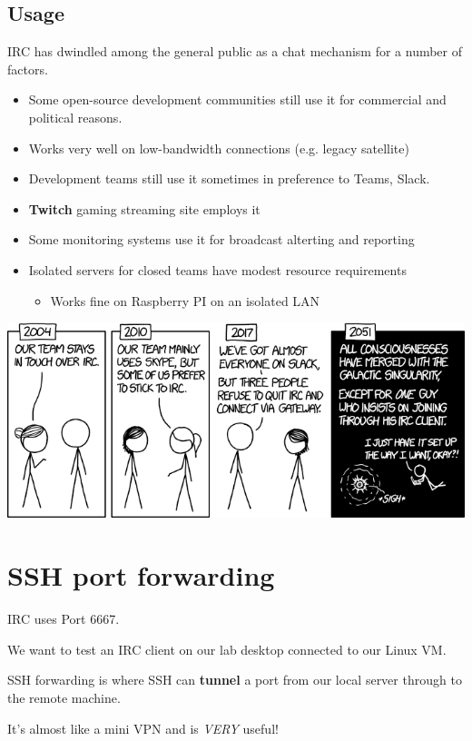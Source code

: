 \documentclass[slides]{pgnotes}
\begin{document}
\subsection{Usage}

IRC has dwindled among the general public as a chat mechanism for a number of factors.

\begin{itemize}
\item Some open-source development communities still use it for commercial and political reasons.
\item Works very well on low-bandwidth connections (e.g. legacy satellite)
\item Development teams still use it sometimes in preference to Teams, Slack.
\item \textbf{Twitch} gaming streaming site employs it
\item Some monitoring systems use it for broadcast alterting and reporting
\item Isolated servers for closed teams have modest resource requirements
  \begin{itemize}
  \item Works fine on Raspberry PI on an isolated LAN
  \end{itemize}
\end{itemize}

\newpage

\includegraphics[width=1.0\linewidth]{xkcd_irc}


\section{SSH port forwarding}

IRC uses Port 6667.

We want to test an IRC client on our lab desktop connected to our Linux VM.

SSH forwarding is where SSH can \textbf{tunnel} a port from our local server through to the remote machine.

It's almost like a mini VPN and is \textit{VERY} useful!
\end{document}
